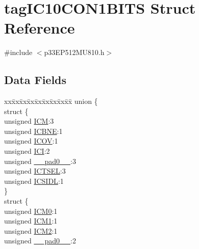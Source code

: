 \hypertarget{structtag_i_c10_c_o_n1_b_i_t_s}{}\section{tag\+I\+C10\+C\+O\+N1\+B\+I\+TS Struct Reference}
\label{structtag_i_c10_c_o_n1_b_i_t_s}


{\ttfamily \#include $<$p33\+E\+P512\+M\+U810.\+h$>$}

\subsection*{Data Fields}
\begin{DoxyCompactItemize}
\item 
\begin{tabbing}
xx\=xx\=xx\=xx\=xx\=xx\=xx\=xx\=xx\=\kill
union \{\\
\>struct \{\\
\>\>unsigned \hyperlink{structtag_i_c10_c_o_n1_b_i_t_s_ad3edde44ecb2d349ffa2decd0a251c20}{ICM}:3\\
\>\>unsigned \hyperlink{structtag_i_c10_c_o_n1_b_i_t_s_a824e7dcca83939e1b049d63ffcee33e9}{ICBNE}:1\\
\>\>unsigned \hyperlink{structtag_i_c10_c_o_n1_b_i_t_s_a49392949376ba0bf58cf8db889e86c94}{ICOV}:1\\
\>\>unsigned \hyperlink{structtag_i_c10_c_o_n1_b_i_t_s_a72486dcb868aad2d5c978494691356cc}{ICI}:2\\
\>\>unsigned \hyperlink{structtag_i_c10_c_o_n1_b_i_t_s_adf71f3d8410c1f1dbbc96680a92c49af}{\_\_pad0\_\_}:3\\
\>\>unsigned \hyperlink{structtag_i_c10_c_o_n1_b_i_t_s_a7a9dd41b5f93eb620df7fa336e452677}{ICTSEL}:3\\
\>\>unsigned \hyperlink{structtag_i_c10_c_o_n1_b_i_t_s_af441b36127c0bb7a35162dfc9a64103c}{ICSIDL}:1\\
\>\} \\
\>struct \{\\
\>\>unsigned \hyperlink{structtag_i_c10_c_o_n1_b_i_t_s_a649b1dd9bca75e558f37a9f52a829bd4}{ICM0}:1\\
\>\>unsigned \hyperlink{structtag_i_c10_c_o_n1_b_i_t_s_af3fe77ef9f8ca41ff11519f445e7bc77}{ICM1}:1\\
\>\>unsigned \hyperlink{structtag_i_c10_c_o_n1_b_i_t_s_a3c62c9cbbc3a406402126c932b709db8}{ICM2}:1\\
\>\>unsigned \hyperlink{structtag_i_c10_c_o_n1_b_i_t_s_adf71f3d8410c1f1dbbc96680a92c49af}{\_\_pad0\_\_}:2\\

\end{tabbing}
\end{DoxyCompactItemize}

